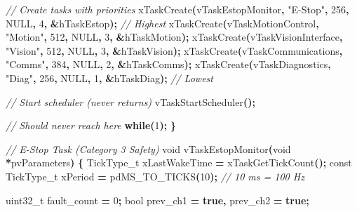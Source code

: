 \documentclass[
]{article}
\newenvironment{Shaded}{\begin{snugshade}}{\end{snugshade}}
\newcommand{\CommentTok}[1]{\textcolor[rgb]{0.56,0.35,0.01}{\textit{#1}}}
\newcommand{\ControlFlowTok}[1]{\textcolor[rgb]{0.13,0.29,0.53}{\textbf{#1}}}
\newcommand{\DataTypeTok}[1]{\textcolor[rgb]{0.13,0.29,0.53}{#1}}
\newcommand{\DecValTok}[1]{\textcolor[rgb]{0.00,0.00,0.81}{#1}}
\newcommand{\KeywordTok}[1]{\textcolor[rgb]{0.13,0.29,0.53}{\textbf{#1}}}
\newcommand{\NormalTok}[1]{#1}
\newcommand{\OperatorTok}[1]{\textcolor[rgb]{0.81,0.36,0.00}{\textbf{#1}}}
\newcommand{\StringTok}[1]{\textcolor[rgb]{0.31,0.60,0.02}{#1}}
\begin{document}
\begin{Shaded}
\begin{Highlighting}[]
    \CommentTok{// Create tasks with priorities}
\NormalTok{    xTaskCreate}\OperatorTok{(}\NormalTok{vTaskEstopMonitor}\OperatorTok{,}  \StringTok{"E{-}Stop"}\OperatorTok{,}    \DecValTok{256}\OperatorTok{,}\NormalTok{ NULL}\OperatorTok{,} \DecValTok{4}\OperatorTok{,} \OperatorTok{\&}\NormalTok{hTaskEstop}\OperatorTok{);}   \CommentTok{// Highest}
\NormalTok{    xTaskCreate}\OperatorTok{(}\NormalTok{vTaskMotionControl}\OperatorTok{,} \StringTok{"Motion"}\OperatorTok{,}    \DecValTok{512}\OperatorTok{,}\NormalTok{ NULL}\OperatorTok{,} \DecValTok{3}\OperatorTok{,} \OperatorTok{\&}\NormalTok{hTaskMotion}\OperatorTok{);}
\NormalTok{    xTaskCreate}\OperatorTok{(}\NormalTok{vTaskVisionInterface}\OperatorTok{,} \StringTok{"Vision"}\OperatorTok{,}  \DecValTok{512}\OperatorTok{,}\NormalTok{ NULL}\OperatorTok{,} \DecValTok{3}\OperatorTok{,} \OperatorTok{\&}\NormalTok{hTaskVision}\OperatorTok{);}
\NormalTok{    xTaskCreate}\OperatorTok{(}\NormalTok{vTaskCommunications}\OperatorTok{,} \StringTok{"Comms"}\OperatorTok{,}    \DecValTok{384}\OperatorTok{,}\NormalTok{ NULL}\OperatorTok{,} \DecValTok{2}\OperatorTok{,} \OperatorTok{\&}\NormalTok{hTaskComms}\OperatorTok{);}
\NormalTok{    xTaskCreate}\OperatorTok{(}\NormalTok{vTaskDiagnostics}\OperatorTok{,}   \StringTok{"Diag"}\OperatorTok{,}      \DecValTok{256}\OperatorTok{,}\NormalTok{ NULL}\OperatorTok{,} \DecValTok{1}\OperatorTok{,} \OperatorTok{\&}\NormalTok{hTaskDiag}\OperatorTok{);}    \CommentTok{// Lowest}

    \CommentTok{// Start scheduler (never returns)}
\NormalTok{    vTaskStartScheduler}\OperatorTok{();}

    \CommentTok{// Should never reach here}
    \ControlFlowTok{while}\OperatorTok{(}\DecValTok{1}\OperatorTok{);}
\OperatorTok{\}}

\CommentTok{// E{-}Stop Task (Category 3 Safety)}
\DataTypeTok{void}\NormalTok{ vTaskEstopMonitor}\OperatorTok{(}\DataTypeTok{void} \OperatorTok{*}\NormalTok{pvParameters}\OperatorTok{)} \OperatorTok{\{}
\NormalTok{    TickType\_t xLastWakeTime }\OperatorTok{=}\NormalTok{ xTaskGetTickCount}\OperatorTok{();}
    \DataTypeTok{const}\NormalTok{ TickType\_t xPeriod }\OperatorTok{=}\NormalTok{ pdMS\_TO\_TICKS}\OperatorTok{(}\DecValTok{10}\OperatorTok{);}  \CommentTok{// 10 ms = 100 Hz}

    \DataTypeTok{uint32\_t}\NormalTok{ fault\_count }\OperatorTok{=} \DecValTok{0}\OperatorTok{;}
    \DataTypeTok{bool}\NormalTok{ prev\_ch1 }\OperatorTok{=} \KeywordTok{true}\OperatorTok{,}\NormalTok{ prev\_ch2 }\OperatorTok{=} \KeywordTok{true}\OperatorTok{;}


\end{Highlighting}
\end{Shaded}
\end{document}
